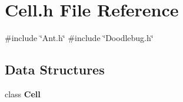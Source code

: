 \section{Cell.\+h File Reference}
\label{Cell_8h}
{\ttfamily \#include \char`\"{}Ant.\+h\char`\"{}}\newline
{\ttfamily \#include \char`\"{}Doodlebug.\+h\char`\"{}}\newline
\subsection*{Data Structures}
\begin{DoxyCompactItemize}
\item 
class \textbf{ Cell}
\end{DoxyCompactItemize}
